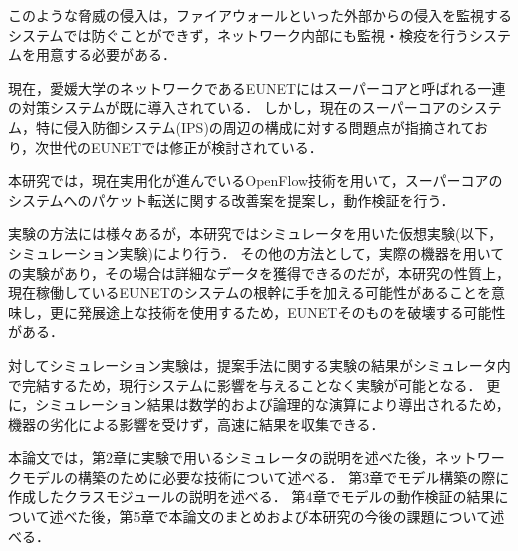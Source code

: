 このような脅威の侵入は，ファイアウォールといった外部からの侵入を監視するシステムでは防ぐことができず，ネットワーク内部にも監視・検疫を行うシステムを用意する必要がある．

現在，愛媛大学のネットワークであるEUNETにはスーパーコアと呼ばれる一連の対策システムが既に導入されている．
しかし，現在のスーパーコアのシステム，特に侵入防御システム(IPS)の周辺の構成に対する問題点が指摘されており，次世代のEUNETでは修正が検討されている．

本研究では，現在実用化が進んでいるOpenFlow技術を用いて，スーパーコアのシステムへのパケット転送に関する改善案を提案し，動作検証を行う．

実験の方法には様々あるが，本研究ではシミュレータを用いた仮想実験(以下，シミュレーション実験)により行う．
その他の方法として，実際の機器を用いての実験があり，その場合は詳細なデータを獲得できるのだが，本研究の性質上，現在稼働しているEUNETのシステムの根幹に手を加える可能性があることを意味し，更に発展途上な技術を使用するため，EUNETそのものを破壊する可能性がある．

対してシミュレーション実験は，提案手法に関する実験の結果がシミュレータ内で完結するため，現行システムに影響を与えることなく実験が可能となる．
更に，シミュレーション結果は数学的および論理的な演算により導出されるため，機器の劣化による影響を受けず，高速に結果を収集できる．

本論文では，第2章に実験で用いるシミュレータの説明を述べた後，ネットワークモデルの構築のために必要な技術について述べる．
第3章でモデル構築の際に作成したクラスモジュールの説明を述べる．
第4章でモデルの動作検証の結果について述べた後，第5章で本論文のまとめおよび本研究の今後の課題について述べる．